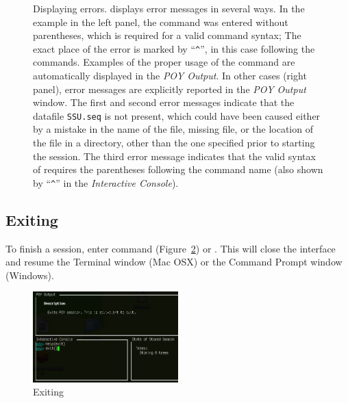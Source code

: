 \begin{figure}
\caption{Displaying errors. \poy displays error messages in several ways. In the example in the left panel, the command  was entered without parentheses, which is required for a  valid \poy command syntax; The exact place of the error is marked by ``\texttt{\^}'', in this case  following the  commands. Examples of the proper usage of the command are automatically displayed in the \emph{POY Output}. In other cases (right panel), error messages are explicitly reported in the \emph{POY Output} window. The first and second error messages indicate that the datafile \texttt{SSU.seq} is not present, which could have been caused either by a mistake in the name of the file, missing file, or the location of the file in a directory, other than the one specified prior to starting the \poy session. The third error message indicates that the valid syntax of  requires the parentheses following the command name (also shown by ``\texttt{\^}'' in  the \emph{Interactive Console}).}
\label{fig:errors}
\end{figure}

\subsection{Exiting}
To finish a \poy session, enter command  (Figure~\ref{fig:exithelp}) or . This will close the \poy interface and resume the Terminal window (Mac OSX) or the Command Prompt window (Windows).

\begin{figure}[]
    \begin{center}
        \includegraphics[width=0.5\textwidth]{figures/exithelp.jpg}
    \end{center}
    \caption{Exiting \poy}
    \label{fig:exithelp}
\end{figure}

